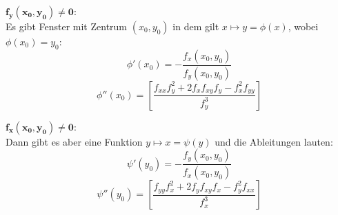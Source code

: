\documentclass[a4paper]{article}
\begin{document}
		\begin{fdef}
			\vspace{-3mm}
			\begin{multicols}{2}
			$\mathbf{f_y(x_0,y_0)\neq 0}$:\\
			Es gibt Fenster mit Zentrum $(x_0,y_0)$ in dem gilt $x\mapsto y=\phi(x)$, wobei $\phi(x_0)=y_0$:
			$$\phi'(x_0)=-\frac{f_x(x_0,y_0)}{f_y(x_0,y_0)}$$
			$$\phi''(x_0)=[\frac{f_{xx}f_{y}^2+2f_{x}f_{xy}f_{y}-f_x^2f_{yy}}{f_y^3}]$$

			$\mathbf{f_x(x_0,y_0)\neq 0}$:\\
			Dann gibt es aber eine Funktion $y\mapsto x=\psi(y)$ und die Ableitungen lauten:
			$$\psi'(y_0)=-\frac{f_y(x_0,y_0)}{f_x(x_0,y_0)}$$
			$$\psi''(y_0)=[\frac{f_{yy}f_{x}^2+2f_{y}f_{xy}f_{x}-f_y^2f_{xx}}{f_x^3}]$$
			\end{multicols}
			\vspace{-2mm}
		\end{fdef}
		
	\newpage
\end{document}
